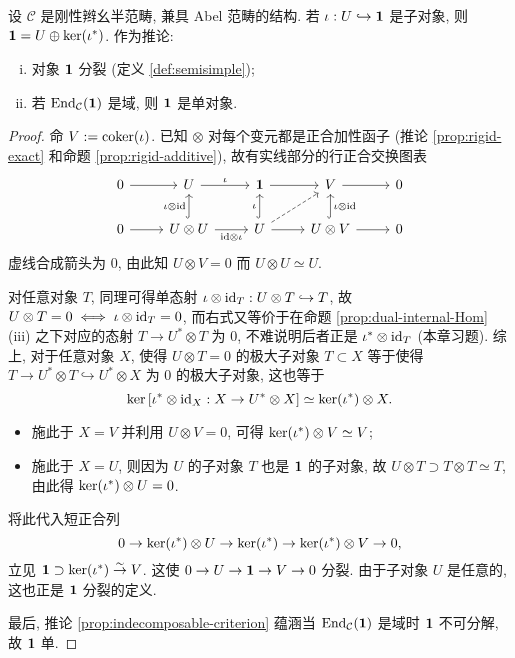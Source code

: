 \begin{proposition}\label{prop:rigid-unit-simple}
	设 $\mathcal{C}$ 是刚性辫幺半范畴, 兼具 Abel 范畴的结构. 若 $\iota: U \hookrightarrow \bm{1}$ 是子对象, 则 $\bm{1} = U \oplus \operatorname{ker}(\iota^*)$. 作为推论:
	\begin{enumerate}[(i)]
		\item 对象 $\bm{1}$ 分裂 (定义 \ref{def:semisimple});
		\item 若 $\operatorname{End}_{\mathcal{C}}(\bm{1})$ 是域, 则 $\bm{1}$ 是单对象.
	\end{enumerate}
\end{proposition}
\begin{proof}
	命 $V := \operatorname{coker}(\iota)$. 已知 $\otimes$ 对每个变元都是正合加性函子 (推论 \ref{prop:rigid-exact} 和命题 \ref{prop:rigid-additive}), 故有实线部分的行正合交换图表
	\[\begin{tikzcd}
		0 \arrow[r] & U \arrow[r, "\iota"] & \munit \arrow[r] & V \arrow[r] & 0 \\
		0 \arrow[r] & U \otimes U \arrow[hookrightarrow, u, "{\iota \otimes \identity}"] \arrow[r, "{\identity \otimes \iota}"'] & U \arrow[hookrightarrow, u, "\iota"] \arrow[r] \arrow[dashed, ru] & U \otimes V \arrow[hookrightarrow, u, "{\iota \otimes \identity}"'] \arrow[r] & 0
	\end{tikzcd}\]
	虚线合成箭头为 $0$, 由此知 $U \otimes V = 0$ 而 $U \otimes U \simeq U$.
	
	对任意对象 $T$, 同理可得单态射 $\iota \otimes \mathrm{id}_T : U \otimes T \hookrightarrow T$, 故 $U \otimes T = 0 \iff \iota \otimes \mathrm{id}_T = 0$, 而右式又等价于在命题 \ref{prop:dual-internal-Hom} (iii) 之下对应的态射 $T \to U^* \otimes T$ 为 $0$, 不难说明后者正是 $\iota^* \otimes \mathrm{id}_T$ (本章习题). 综上, 对于任意对象 $X$, 使得 $U \otimes T = 0$ 的极大子对象 $T \subset X$ 等于使得 $T \to U^* \otimes T \hookrightarrow U^* \otimes X$ 为 $0$ 的极大子对象, 这也等于
	\[ \operatorname{ker}\left[ \iota^* \otimes \mathrm{id}_X: X \to U^* \otimes X \right] \simeq \operatorname{ker}(\iota^*) \otimes X. \]
	\begin{itemize}
		\item 施此于 $X = V$ 并利用 $U \otimes V = 0$, 可得 $\operatorname{ker}(\iota^*) \otimes V \simeq V$;
		\item 施此于 $X = U$, 则因为 $U$ 的子对象 $T$ 也是 $\bm{1}$ 的子对象, 故 $U \otimes T \supset T \otimes T \simeq T$, 由此得 $\operatorname{ker}(\iota^*) \otimes U = 0$.
	\end{itemize}
	
	将此代入短正合列 
	\[ 0 \to \operatorname{ker}(\iota^*) \otimes U \to \operatorname{ker}(\iota^*) \to \operatorname{ker}(\iota^*) \otimes V \to 0, \]
	立见 $\bm{1} \supset \operatorname{ker}(\iota^*) \stackrel{\sim}{\rightarrow} V$. 这使 $0 \to U \to \bm{1} \to V \to 0$ 分裂. 由于子对象 $U$ 是任意的, 这也正是 $\bm{1}$ 分裂的定义.
	
	最后, 推论 \ref{prop:indecomposable-criterion} 蕴涵当 $\operatorname{End}_{\mathcal{C}}(\bm{1})$ 是域时 $\bm{1}$ 不可分解, 故 $\bm{1}$ 单.
\end{proof}

